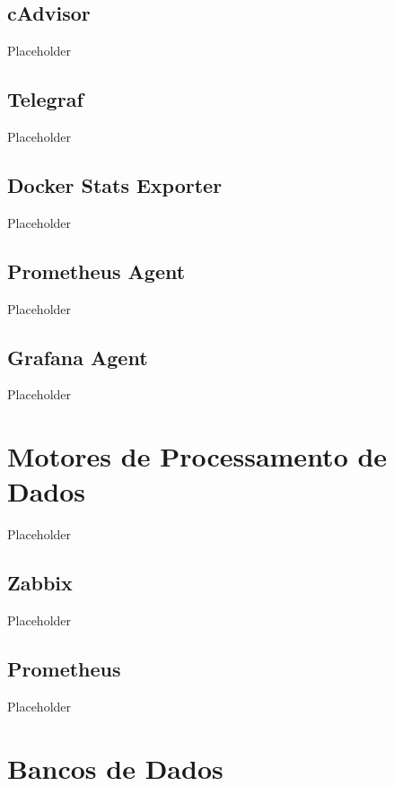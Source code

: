 \subsection{cAdvisor}
\label{subsection:cAdvisor}

Placeholder

\subsection{Telegraf}
\label{subsection:Telegraf}

Placeholder

\subsection{Docker Stats Exporter}
\label{subsection:DockerStatsExporter}

Placeholder

\subsection{Prometheus Agent}
\label{subsection:PrometheusAgent}

Placeholder

\subsection{Grafana Agent}
\label{subsection:GrafanaAgent}

Placeholder

\section{Motores de Processamento de Dados}
\label{section:MotoresProcessamento}

Placeholder

\subsection{Zabbix}
\label{subsection:Zabbix}

Placeholder

\subsection{Prometheus}
\label{subsection:Prometheus}

Placeholder

\section{Bancos de Dados}
\label{section:BancosDados}

